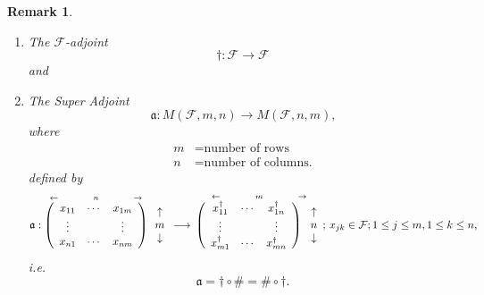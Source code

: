 \documentclass[aps, preprint]{revtex4}
\newtheorem{remark}[theorem]{Remark}
\begin{document}
\begin{remark}
\begin{enumerate}
\item The $\mathcal{F}$\emph{-adjoint}
\begin{equation} \dag  :\mathcal{F} \rightarrow \mathcal{F}
\end{equation}and 

\item The \emph{Super Adjoint}
\begin{equation}\mathfrak{a} :M \left (\mathcal{F} ,m ,n\right ) \rightarrow M \left (\mathcal{F} ,n ,m\right )\text{,}
\end{equation}where
\begin{align}m &  =\text{number of rows} \\
n &  =\text{number of columns.}\end{align}defined by
\begin{equation}\mathfrak{a} :\overset{ \leftarrow \text{\quad \quad \quad \quad }n\text{\quad \quad \quad \quad } \rightarrow }{\left (\begin{array}{ccc}x_{1 1} & \cdots  & x_{1 m} \\
\vdots  & \, & \vdots  \\
x_{n 1} & \cdots  & x_{n m}\end{array}\right )}\, \begin{array}{c}\uparrow  \\
m \\
\downarrow \end{array} \longrightarrow \,\overset{ \leftarrow \text{\quad \quad \quad \quad }m\text{\quad \quad \quad \quad } \rightarrow }{\left (\begin{array}{ccc}x_{1 1}^{ \dag } & \cdots  & x_{1 n}^{ \dag } \\
\vdots  & \, & \vdots  \\
x_{m 1}^{ \dag } & \cdots  & x_{m n}^{ \dag }\end{array}\right )\, \begin{array}{c}\uparrow  \\
n \\
\downarrow \end{array}} ;\,x_{j k} \in \mathcal{F} ;1 \leq j \leq m ,1 \leq k \leq n\text{,}
\end{equation}i.e.
\begin{equation}\mathfrak{a} = \dag  \circ \# =\# \circ  \dag \text{.}
\end{equation}\end{enumerate}
\end{remark}
\end{document}
